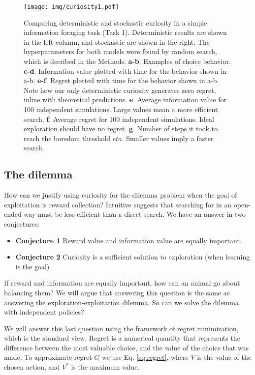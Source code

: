 \begin{figure}
	\begin{fullwidth}
	\texttt{[image: img/curiosity1.pdf]} 
	\caption{Comparing deterministic and stochastic curiosity in a simple information foraging task (Task 1). Deterministic results are shown in the left column, and stochastic are shown in the right. The hyperparameters for both models were found by random search, which is decribed in the Methods.
	\textbf{a-b}. Examples of choice behavior.
	\textbf{c-d}. Information value plotted with time for the behavior shown in a-b.
	\textbf{e-f}. Regret plotted with time for the behavior shown in a-b. Note how our only deterministic curiosity generates zero regret, inline with theoretical predictions.
	\textbf{e}. Average information value for 100 independent simulations. Large values mean a more efficient search.
	\textbf{f}. Average regret for 100 independent simulations. Ideal exploration should have no regret. 
	\textbf{g}. Number of steps it took to reach the boredom threshold $eta$. Smaller values imply a faster search.
	}
	\label{fig:curiosity1} 
	\end{fullwidth}
\end{figure}

\subsection{The dilemma}
How can we justify using curiosity for the dilemma problem when the goal of exploitation is reward collection? Intuitive suggests that searching for in an open-ended way must be less efficient than a direct search. We have an answer in two conjectures:

\begin{itemize}
	\item \textbf{Conjecture 1} Reward value and information value are equally important.
	\item \textbf{Conjecture 2} Curiosity is a sufficient solution to exploration (when learning is the goal)
\end{itemize}

If reward and information are equally important, how can an animal go about balancing them? We will argue that answering this question is the same as answering the exploration-exploitation dilemma. So can we solve the dilemma with independent policies? 

We will answer this last question using the framework of regret minimization, which is the standard view. Regret is a numerical quantity that represents the difference between the most valuable choice, and the value of the choice that was made. To approximate regret $G$ we use Eq. \ref{eq:regret}, where $V$ is the value of the chosen action, and $V^*$ is the maximum value. 

